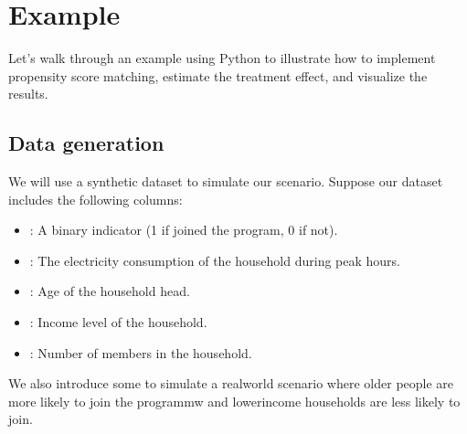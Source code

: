 \documentclass[letterpaper,10pt,english]{jupyterBook}
\begin{document}
\section{Example}
\label{\detokenize{notebooks/propensity_scores:example}}
\sphinxAtStartPar
Let’s walk through an example using Python to illustrate how to implement propensity score matching, estimate the treatment effect, and visualize the results.


\subsection{Data generation}
\label{\detokenize{notebooks/propensity_scores:data-generation}}
\sphinxAtStartPar
We will use a synthetic dataset to simulate our scenario. Suppose our dataset includes the following columns:
\begin{itemize}
\item {} 
\sphinxAtStartPar
{}: A binary indicator (1 if joined the program, 0 if not).

\item {} 
\sphinxAtStartPar
{}: The electricity consumption of the household during peak hours.

\item {} 
\sphinxAtStartPar
{}: Age of the household head.

\item {} 
\sphinxAtStartPar
{}: Income level of the household.

\item {} 
\sphinxAtStartPar
{}: Number of members in the household.

\end{itemize}

\sphinxAtStartPar
We also introduce some  to simulate a real\sphinxhyphen{}world scenario where older people are more likely to join the programmw and lower\sphinxhyphen{}income households are less likely to join.
\end{document}
